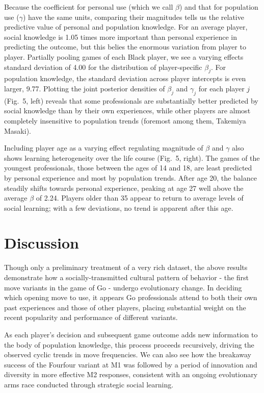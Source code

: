 \documentclass{article}
\begin{document}
Because the coefficient for personal use (which we call $\beta$) and that for population use ($\gamma$) have the same units, comparing their magnitudes tells us the relative predictive value of personal and population knowledge.  For an average player, social knowledge is 1.05 times more important than personal experience in predicting the outcome, but this belies the enormous variation from player to player.  Partially pooling games of each Black player, we see a varying effects standard deviation of 4.00 for the distribution of player-specific $\beta_j$.  For population knowledge, the standard deviation across player intercepts is even larger, 9.77.  Plotting the joint posterior densities of $\beta_j$ and $\gamma_j$ for each player $j$ (Fig.~5, left) reveals that some professionals are substantially better predicted by social knowledge than by their own experiences, while other players are almost completely insensitive to population trends (foremost among them, Takemiya Masaki).  

Including player age as a varying effect regulating magnitude of $\beta$ and $\gamma$ also shows learning heterogeneity over the life course (Fig.~5, right).  The games of the youngest professionals, those between the ages of 14 and 18, are least predicted by personal experience and most by population trends.  After age 20, the balance steadily shifts towards personal experience, peaking at age 27 well above the average $\beta$ of 2.24.  Players older than 35 appear to return to average levels of social learning; with a few deviations, no trend is apparent after this age.



\section{Discussion}

Though only a preliminary treatment of a very rich dataset, the above results demonstrate how a socially-transmitted cultural pattern of behavior - the first move variants in the game of Go - undergo evolutionary change.  In deciding which opening move to use, it appears Go professionals attend to both their own past experiences and those of other players, placing substantial weight on the recent popularity and performance of different variants.  

As each player's decision and subsequent game outcome adds new information to the body of population knowledge, this process proceeds recursively, driving the observed cyclic trends in move frequencies.  We can also see how the breakaway success of the Fourfour variant at M1 was followed by a period of innovation and diversity in more effective M2 responses, consistent with an ongoing evolutionary arms race conducted through strategic social learning.
\end{document}
